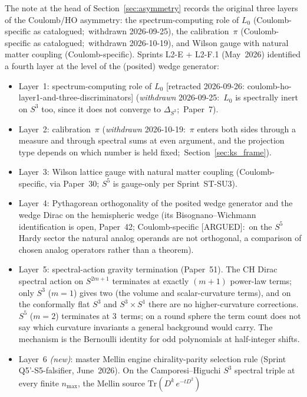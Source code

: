 \documentclass[twocolumn,pra,amsmath,amssymb,superscriptaddress]{revtex4-2}
\begin{document}
The note at the head of Section~\ref{sec:asymmetry} records
the original three layers of the Coulomb/HO asymmetry: the spectrum-computing
role of $L_0$ (Coulomb-specific as catalogued;\ withdrawn 2026-09-25), the calibration~$\pi$
(Coulomb-specific as catalogued;\ withdrawn 2026-10-19), and Wilson gauge with natural matter coupling
(Coulomb-specific).  Sprints L2-E + L2-F.1 (May~2026) identified a
fourth layer at the level of the (posited) wedge generator:

\begin{itemize}\setlength{\itemsep}{2pt}
\item Layer~1: spectrum-computing role of $L_0$ [retracted 2026-09-26: coulomb-ho-layer1-and-three-discriminators]
  (\emph{withdrawn} 2026-09-25:\ $L_0$ is spectrally inert on $S^3$
  too, since it does not converge to $\Delta_{S^3}$;\ Paper~7).
\item Layer~2: calibration~$\pi$ (\emph{withdrawn} 2026-10-19:\
  $\pi$ enters both sides through a measure and through spectral sums
  at even argument, and the projection type depends on which number is
  held fixed;\ Section~\ref{sec:ks_frame}).
\item Layer~3: Wilson lattice gauge with natural matter coupling
  (Coulomb-specific, via Paper~30; $S^5$ is gauge-only per
  Sprint~ST-SU3).
\item Layer~4: Pythagorean orthogonality of the posited wedge
  generator and the wedge Dirac on the hemispheric wedge (its
  Bisognano--Wichmann identification is open, Paper~42;
  Coulomb-specific [ARGUED]:\ on the $S^5$ Hardy sector the natural
  analog operands are not orthogonal, a comparison of chosen analog
  operators rather than a theorem).
\item Layer~5: spectral-action gravity termination
  (Paper~51). The CH Dirac spectral action on $S^{2m+1}$ terminates
  at exactly $(m{+}1)$ power-law terms; only $S^3$ ($m=1$) gives two
  (the volume and scalar-curvature terms), and on the conformally flat
  $S^3$ and $S^3 \times S^1$ there are no higher-curvature
  corrections. $S^5$ ($m=2$) terminates at 3~terms; on a round sphere
  the term count does not say which curvature invariants a general
  background would carry. The mechanism is the
  Bernoulli identity for odd polynomials at half-integer shifts.
\item Layer~6 \emph{(new)}: master Mellin engine chirality-parity
  selection rule (Sprint Q5'-S5-falsifier, June~2026).  On the
  Camporesi--Higuchi $S^3$ spectral triple at every finite
  $n_{\max}$, the Mellin source $\mathrm{Tr}(D^k\,e^{-tD^2})$

\end{itemize}
\end{document}
